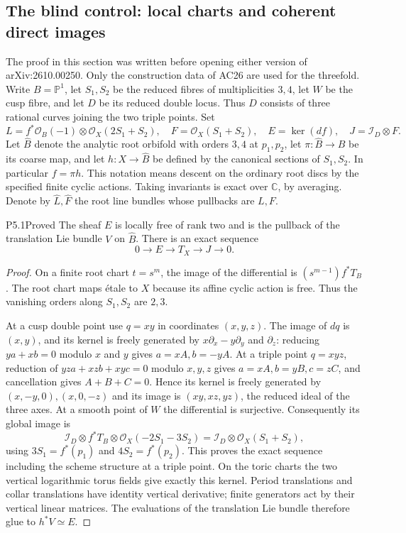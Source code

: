 \subsection{The blind control: local charts and coherent direct images}

The proof in this section was written before opening either version of
arXiv:2610.00250.  Only the construction data of AC26 are used for the
threefold.  Write $B=\mathbb P^1$, let $S_1,S_2$ be the reduced fibres of
multiplicities $3,4$, let $W$ be the cusp fibre, and let $D$ be its reduced
double locus.  Thus $D$ consists of three rational curves joining the two
triple points.  Set
\[
 L=f^*\mathcal O_B(-1)\otimes\mathcal O_X(2S_1+S_2),\quad
 F=\mathcal O_X(S_1+S_2),\quad
 E=\ker(df),\quad J=\mathcal I_D\otimes F.
\]
Let $\widehat B$ denote the analytic root orbifold with orders $3,4$ at
$p_1,p_2$, let $\pi:\widehat B\to B$ be its coarse map, and let
$h:X\to\widehat B$ be defined by the canonical sections of $S_1,S_2$.
In particular $f=\pi h$.  This notation means descent on the ordinary
root discs by the specified finite cyclic actions.  Taking invariants is
exact over $\mathbb C$, by averaging.  Denote by $\widehat L,\widehat F$
the root line bundles whose pullbacks are $L,F$.

\begin{statement}{P5.1}{Proved}
The sheaf $E$ is locally free of rank two and is the pullback of the
translation Lie bundle $V$ on $\widehat B$.  There is an exact sequence
\begin{equation}\label{eq:P5tangent}
 0\longrightarrow E\longrightarrow T_X\longrightarrow J\longrightarrow0.
\end{equation}
\end{statement}
\begin{proof}
On a finite root chart $t=s^m$, the image of the differential is
$(s^{m-1})f^*T_B$.  The root chart maps étale to $X$ because its affine
cyclic action is free.  Thus the vanishing orders along $S_1,S_2$ are
$2,3$.

At a cusp double point use $q=xy$ in coordinates $(x,y,z)$.  The image of
$dq$ is $(x,y)$, and its kernel is freely generated by
$x\partial_x-y\partial_y$ and $\partial_z$: reducing $ya+xb=0$ modulo
$x$ and $y$ gives $a=xA,b=-yA$.  At a triple point $q=xyz$, reduction of
$yz a+xz b+xy c=0$ modulo $x,y,z$ gives
$a=xA,b=yB,c=zC$, and cancellation gives $A+B+C=0$.  Hence its kernel is
freely generated by $(x,-y,0),(x,0,-z)$ and its image is
$(xy,xz,yz)$, the reduced ideal of the three axes.  At a smooth point of
$W$ the differential is surjective.  Consequently its global image is
\[
 \mathcal I_D\otimes f^*T_B\otimes\mathcal O_X(-2S_1-3S_2)
 =\mathcal I_D\otimes\mathcal O_X(S_1+S_2),
\]
using $3S_1=f^*(p_1)$ and $4S_2=f^*(p_2)$.  This proves the exact sequence
including the scheme structure at a triple point.  On the toric charts
the two vertical logarithmic torus fields give exactly this kernel.
Period translations and collar translations have identity vertical
derivative; finite generators act by their vertical linear matrices.
The evaluations of the translation Lie bundle therefore glue to
$h^*V\simeq E$.
\end{proof}


